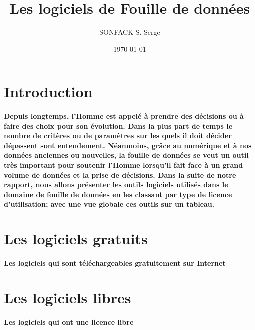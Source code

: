 \documentclass[12pt]{article}
\begin{document}
	\begin{titlepage}
		\clearpage 
		\title{Les logiciels de Fouille de données}
		\author{SONFACK S. Serge}
		\date{\today}
		\maketitle
		\thispagestyle{empty}
	\end{titlepage}
\newpage
\tableofcontents

\newpage
\listoftables
\newpage

\section*{Introduction}
	
	\paragraph{ \indent Depuis longtemps, l'Homme est appelé à prendre des décisions ou à faire des choix pour son évolution. Dans la plus part de temps le nombre de critères ou de paramètres sur les quels il doit décider dépassent sont entendement.
	Néanmoins, grâce au numérique et à nos données anciennes ou nouvelles, la fouille de données se veut un outil très important pour soutenir l'Homme lorsqu'il fait face à un grand volume de données et la prise de décisions.
	Dans la suite de notre rapport, nous allons présenter les outils logiciels  utilisés dans le domaine de fouille de données en les classant par type de licence d'utilisation; avec une vue globale ces outils sur un tableau.}
\newpage
	\section{Les logiciels gratuits}
		\paragraph{Les logiciels qui sont téléchargeables gratuitement sur Internet}
		
	\section{Les logiciels libres}
		\paragraph{Les logiciels qui ont une licence libre}
\end{document}
